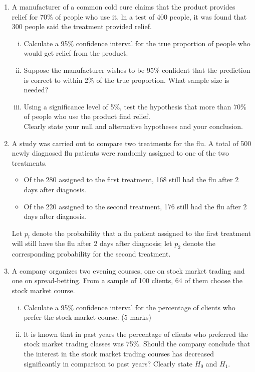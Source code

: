 \documentclass[]{article}
\begin{document}
\begin{enumerate}
\item 
A manufacturer of a common cold cure claims that the product provides
relief for 70\% of people who use it. ln a test of 400 people, it was found
that 300 people said the treatment provided relief.

\begin{enumerate}[(i)]
	\item Calculate a 95\% confidence interval for the true proportion of
	people who would get relief from the product.
	
	\item Suppose the manufacturer wishes to be 95\% confident that the
	prediction is correct to within 2\% of the true proportion. What
	sample size is needed?
	
	\item Using a significance level of 5\%, test the hypothesis that more than
	70\% of people who use the product find relief.\\ Clearly state your
	null and alternative hypotheses and your conclusion.
\end{enumerate}

\item 
A study was carried out to compare two treatments for the flu. A total of 500
newly diagnosed flu patients were randomly assigned to one of the two treatments.
\begin{itemize}
	\item Of the 280 assigned to the first treatment, 168 still had the flu after 2 days after
	diagnosis. \item Of the 220 assigned to the second treatment, 176 still had the flu after 2
	days after diagnosis. \end{itemize} Let $p_l$ denote the probability that a flu patient assigned to the
first treatment will still have the flu after 2 days after diagnosis; let $p_2$ denote the
corresponding probability for the second treatment.

\item 
A company organizes two evening courses, one on stock market trading and one on
spread-betting. From a sample of 100 clients, 64 of them choose the stock market course.

\begin{enumerate}[(i)]
	\item Calculate a 95\% confidence interval for the percentage of clients who
	prefer the stock market course. (5 marks)
	\item lt is known that in past years the percentage of clients who preferred the
	stock market trading classes was 75\%. Should the company conclude that
	the interest in the stock market trading courses has decreased significantly in
	comparison to past years? Clearly state $H_0$ and $H_1$.
\end{enumerate}


\end{enumerate}
\end{document}
